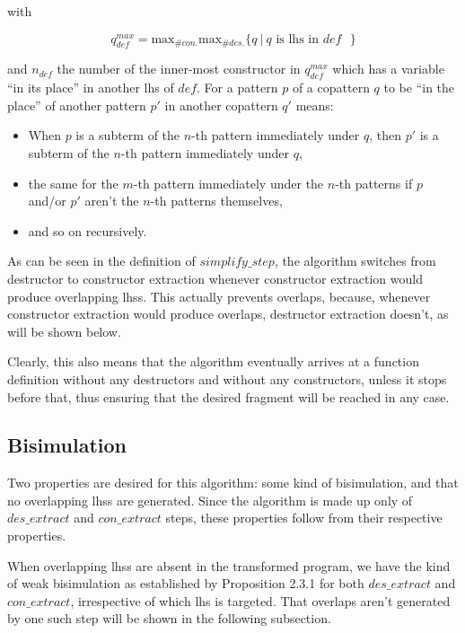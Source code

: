 with

\[
q^{max}_{def} = \textrm{max}_{\# con.} \textrm{max}_{\# des.} \{q ~ | ~ q \text{ is lhs in $def$ } \}
\]

and $n_{def}$ the number of the inner-most constructor in $q^{max}_{def}$ which has a variable ``in its place'' in another lhs of $def$. For a pattern $p$ of a copattern $q$ to be ``in the place'' of another pattern $p'$ in another copattern $q'$ means:
\begin{itemize}
\item When $p$ is a subterm of the $n$-th pattern immediately under $q$, then $p'$ is a subterm of the $n$-th pattern immediately under $q$,

\item the same for the $m$-th pattern immediately under the $n$-th patterns if $p$ and/or $p'$ aren't the $n$-th patterns themselves,

\item and so on recursively.
\end{itemize}

As can be seen in the definition of $simplify\_step$, the algorithm switches from destructor to constructor extraction whenever constructor extraction would produce overlapping lhss. This actually prevents overlaps, because, whenever constructor extraction would produce overlaps, destructor extraction doesn't, as will be shown below.

Clearly, this also means that the algorithm eventually arrives at a function definition without any destructors and without any constructors, unless it stops before that, thus ensuring that the desired fragment will be reached in any case.

\subsection{Bisimulation}

Two properties are desired for this algorithm: some kind of bisimulation, and that no overlapping lhss are generated. Since the algorithm is made up only of $des\_extract$ and $con\_extract$ steps, these properties follow from their respective properties.

When overlapping lhss are absent in the transformed program, we have the kind of weak bisimulation as established by Proposition 2.3.1 for both $des\_extract$ and $con\_extract$, irrespective of which lhs is targeted. That overlaps aren't generated by one such step will be shown in the following subsection.

